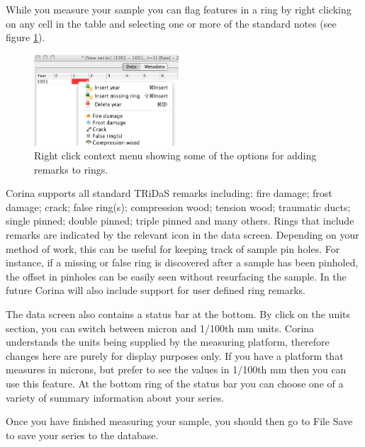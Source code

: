 While you measure your sample you can flag features in a ring by right clicking on any cell in the table and selecting one or more of the standard notes (see figure \ref{fig:ringremarks}).  

\begin{figure}
  \begin{center}
    \includegraphics[width=0.48\textwidth]{Images/ringremarks.png}
  \end{center}
  \caption{Right click context menu showing some of the options for adding remarks to rings.}
  \label{fig:ringremarks}
\end{figure}

Corina supports all standard TRiDaS remarks including: fire damage; frost damage; crack; false ring(s); compression wood; tension wood; traumatic ducts; single pinned; double pinned; triple pinned and many others.  Rings that include remarks are indicated by the relevant icon in the data screen.  Depending on your method of work, this can be useful for keeping track of sample pin holes.  For instance, if a missing or false ring is discovered after a sample has been pinholed, the offset in pinholes can be easily seen without resurfacing the sample.  In the future Corina will also include support for user defined ring remarks.  

The data screen also contains a status bar at the bottom. By click on the units section, you can switch between micron and 1/100th mm units. Corina understands the units being supplied by the measuring platform, therefore changes here are purely for display purposes only. If you have a platform that measures in microns, but prefer to see the values in 1/100th mm then you can use this feature. At the bottom ring of the status bar you can choose one of a variety of summary information about your series.

Once you have finished measuring your sample, you should then go to File \MVRightarrow Save to save your series to the database. 